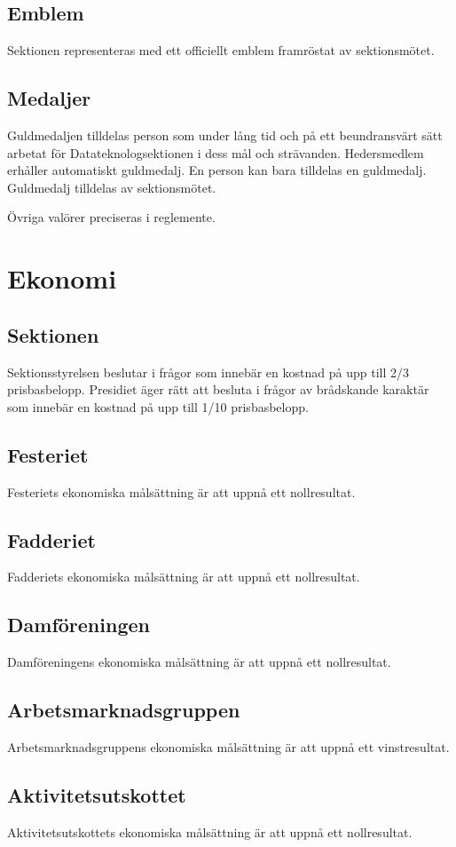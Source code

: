 \documentclass{datateknologsektionen-document}
\begin{document}
\subsection{Emblem}
Sektionen representeras med ett officiellt emblem framröstat av sektionsmötet.
\subsection{Medaljer}
\label{medaljer}
Guldmedaljen tilldelas person som under lång tid och på ett beundransvärt sätt arbetat
för Datateknologsektionen i dess mål och strävanden. Hedersmedlem erhåller
automatiskt guldmedalj. En person kan bara tilldelas en guldmedalj. Guldmedalj tilldelas
av sektionsmötet.

Övriga valörer preciseras i reglemente.

\section{Ekonomi}
\subsection{Sektionen}
\label{ekonomisektionen}
Sektionsstyrelsen beslutar i frågor som innebär en kostnad på upp till 2/3 prisbasbelopp.
Presidiet äger rätt att besluta i frågor av brådskande karaktär som innebär en kostnad på
upp till 1/10 prisbasbelopp.
\subsection{Festeriet}
Festeriets ekonomiska målsättning är att uppnå ett nollresultat.
\subsection{Fadderiet}
Fadderiets ekonomiska målsättning är att uppnå ett nollresultat.
\subsection{Damföreningen}
Damföreningens ekonomiska målsättning är att uppnå ett nollresultat.
\subsection{Arbetsmarknadsgruppen}
Arbetsmarknadsgruppens ekonomiska målsättning är att uppnå ett vinstresultat.
\subsection{Aktivitetsutskottet}
Aktivitetsutskottets ekonomiska målsättning är att uppnå ett nollresultat.
\end{document}
